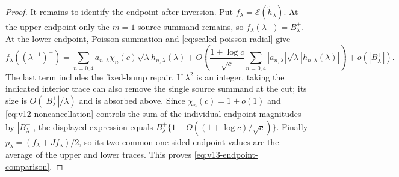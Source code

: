 \documentclass[11pt]{article}
\theoremstyle{remark}
\begin{document}
\begin{proof}
It remains to identify the endpoint after inversion. Put
$f_\lambda=\mathcal E(\widetilde h_\lambda)$. At the upper endpoint only
the $m=1$ source summand remains, so
$f_\lambda(\lambda^-)=B_\lambda^+$. At the lower endpoint, Poisson
summation and \eqref{eq:scaled-poisson-radial} give
\[
 f_\lambda((\lambda^{-1})^+)
 =\sum_{n=0,4}a_{n,\lambda}\chi_n(c)
       \sqrt\lambda h_{n,\lambda}(\lambda)
 +O\!\left(\frac{1+\log c}{\sqrt c}
       \sum_{n=0,4}|a_{n,\lambda}|\sqrt\lambda
                    |h_{n,\lambda}(\lambda)|\right)
 +o(|B_\lambda^+|).
\]
The last term includes the fixed-bump repair. If $\lambda^2$ is an
integer, taking the indicated interior trace can also remove the single
source summand at the cut; its size is $O(|B_\lambda^+|/\lambda)$ and is
absorbed above. Since $\chi_n(c)=1+o(1)$ and
\eqref{eq:v12-noncancellation} controls the sum of the individual endpoint
magnitudes by $|B_\lambda^+|$, the displayed expression equals
$B_\lambda^+\{1+O((1+\log c)/\sqrt c)\}$. Finally
$p_\lambda=(f_\lambda+Jf_\lambda)/2$, so its two common one-sided endpoint
values are the average of the upper and lower traces. This proves
\eqref{eq:v13-endpoint-comparison}.
\end{proof}
\end{document}
